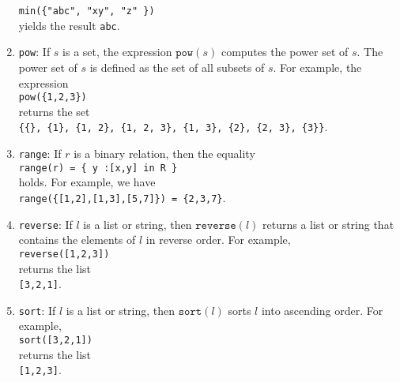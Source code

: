 \begin{enumerate}
      \hspace*{1.3cm}
      \texttt{min(\{"abc", "xy", "z" \})}
      \\[0.2cm]
      yields the result \texttt{abc}.
\item \texttt{pow}:  If $s$ is a set, the expression $\mathtt{pow}(s)$ computes the power
      set of $s$.  The power set of $s$ is defined as the set of all subsets of $s$.  
      For example, the expression
      \\[0.2cm]
      \hspace*{1.3cm}
      \texttt{pow(\{1,2,3\})}
      \\[0.2cm]
      returns the set
      \\[0.2cm]
      \hspace*{1.3cm}
      \texttt{\{\{\}, \{1\}, \{1, 2\}, \{1, 2, 3\}, \{1, 3\}, \{2\}, \{2, 3\}, \{3\}\}}.
\item \texttt{range}: If $r$ is a binary relation, then the equality
      \\[0.2cm]
      \hspace*{1.3cm}
      \texttt{range(r) = \{ y :[x,y] in R \}}
      \\[0.2cm]
      holds.  For example, we have
      \\[0.2cm]
      \hspace*{1.3cm}
      \texttt{range(\{[1,2],[1,3],[5,7]\}) = \{2,3,7\}}.
\item \texttt{reverse}: If $l$ is a list or string, then $\mathtt{reverse}(l)$ returns a 
      list or string that contains the elements of $l$ in reverse order.  For example,
      \\[0.2cm]
      \hspace*{1.3cm}
      \texttt{reverse([1,2,3])}
      \\[0.2cm]
      returns the list
      \\[0.2cm]
      \hspace*{1.3cm}
      \texttt{[3,2,1]}.
\item \texttt{sort}: If $l$ is a list or string, then $\mathtt{sort}(l)$ sorts $l$ into
      ascending order.  For example,
      \\[0.2cm]
      \hspace*{1.3cm}
      \texttt{sort([3,2,1])}
      \\[0.2cm]
      returns the list
      \\[0.2cm]
      \hspace*{1.3cm}
      \texttt{[1,2,3]}.
\end{enumerate}


